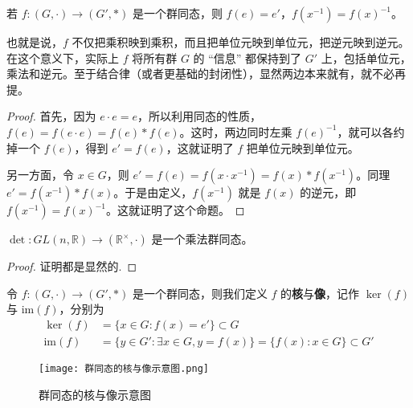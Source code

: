 \documentclass[../../main.tex]{subfiles}
\begin{document}
\begin{proposition}
若 $f : (G, \cdot) \to (G', *)$ 是一个群同态，则 $f(e) = e'$，$f(x^{-1}) = f(x)^{-1}$。
\end{proposition}
\begin{note}
也就是说，$f$ 不仅把乘积映到乘积，而且把单位元映到单位元，把逆元映到逆元。在这个意义下，实际上 $f$ 将所有群 $G$ 的 “信息” 都保持到了 $G'$ 上，包括单位元，乘法和逆元。至于结合律（或者更基础的封闭性），显然两边本来就有，就不必再提。
\end{note}
\begin{proof}
首先，因为 $e \cdot e = e$，所以利用同态的性质，$f(e) = f(e \cdot e) = f(e) * f(e)$。这时，两边同时左乘 $f(e)^{-1}$，就可以各约掉一个 $f(e)$，得到 $e' = f(e)$，这就证明了 $f$ 把单位元映到单位元。

另一方面，令 $x \in G$，则 $e' = f(e) = f(x \cdot x^{-1}) = f(x) * f(x^{-1})$。同理 $e' = f(x^{-1}) * f(x)$。于是由定义，$f(x^{-1})$ 就是 $f(x)$ 的逆元，即 $f(x^{-1}) = f(x)^{-1}$。这就证明了这个命题。 
\end{proof}

\begin{proposition}
$\det : GL(n, \mathbb{R}) \to (\mathbb{R}^\times, \cdot)$ 是一个乘法群同态。 
\end{proposition}
\begin{proof}
证明都是显然的.
\end{proof}

\begin{definition}[群同态的核与像]
令 $f : (G, \cdot) \to (G', *)$ 是一个群同态，则我们定义 $f$ 的\textbf{核}与\textbf{像}，记作 $\ker(f)$ 与 $\mathrm{im}(f)$，分别为
\begin{align*}
\ker(f) &= \{x \in G : f(x) = e'\} \subset G \\
\mathrm{im}(f) &= \{y \in G' : \exists x \in G, y = f(x)\} = \{f(x) : x \in G\} \subset G'
\end{align*} 
\end{definition}

\begin{figure}[htbp]
\centering
\texttt{[image: 群同态的核与像示意图.png]}
\label{figure:群同态的核与像示意图}
\caption{群同态的核与像示意图}
\end{figure}
\end{document}
